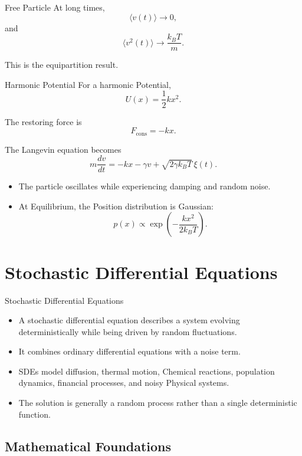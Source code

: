 \documentclass[a4paper, 10pt, onepage]{elegantbook}
\begin{document}
{\begin{frame}{Free Particle}
  At long times,
  \[
    \langle v(t)\rangle\rightarrow0,
  \]
  and
  \[
    \langle v^2(t)\rangle
    \rightarrow
    \frac{k_BT}{m}.
  \]

  This is the equipartition result.
\end{frame}

\begin{frame}{Harmonic Potential}
  For a harmonic Potential,
  \[
    U(x)=\frac{1}{2}kx^2.
  \]

  The restoring force is
  \[
    F_{\mathrm{cons}}=-kx.
  \]

  The Langevin equation becomes
  \[
    m\frac{dv}{dt}
    =
    -kx-\gamma v
    +
    \sqrt{2\gamma k_BT}\,\xi(t).
  \]
\end{frame}

  \begin{itemize}
    \item The particle oscillates while experiencing damping and random noise.
    \item At Equilibrium, the Position distribution is Gaussian:
    \[
      p(x)
      \propto
      \exp\left(
        -\frac{kx^2}{2k_BT}
      \right).
    \]
  \end{itemize}

\newpage

\section{Stochastic Differential Equations}

\begin{frame}{Stochastic Differential Equations}
  \begin{itemize}
    \item A stochastic differential equation describes a system evolving deterministically while being driven by random 
fluctuations.
    \item It combines ordinary differential equations with a noise term.
    \item SDEs model diffusion, thermal motion, Chemical reactions, population dynamics, financial processes, and noisy 
Physical systems.
    \item The solution is generally a random process rather than a single deterministic function.
  \end{itemize}
\end{frame}

\subsection{Mathematical Foundations}

}
\end{document}
